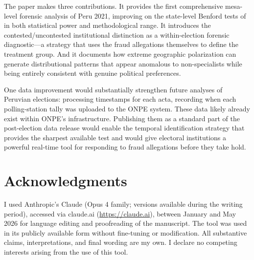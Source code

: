 \documentclass[12pt]{article}
\begin{document}
The paper makes three contributions. It provides the first comprehensive
mesa-level forensic analysis of Peru 2021, improving on the state-level
Benford tests of \citet{isea2021} in both statistical power and methodological
range. It introduces the contested/uncontested institutional distinction as a
within-election forensic diagnostic---a strategy that uses the fraud
allegations themselves to define the treatment group. And it documents
how extreme geographic polarization can generate distributional patterns
that appear anomalous to non-specialists while being entirely consistent
with genuine political preferences.

One data improvement would substantially strengthen future analyses of
Peruvian elections: processing timestamps for each acta, recording when
each polling-station tally was uploaded to the ONPE system. These data
likely already exist within ONPE's infrastructure. Publishing them as a
standard part of the post-election data release would enable the temporal
identification strategy that provides the sharpest available test and would
give electoral institutions a powerful real-time tool for responding to
fraud allegations before they take hold.

\section*{Acknowledgments}

I used Anthropic's Claude (Opus 4 family; versions available during the
writing period), accessed via claude.ai (\url{https://claude.ai}), between
January and May 2026 for language editing and proofreading of the manuscript.
The tool was used in its publicly available form without fine-tuning or
modification. All substantive claims, interpretations, and final wording are
my own. I declare no competing interests arising from the use of this tool.

\newpage



\newpage

\end{document}
